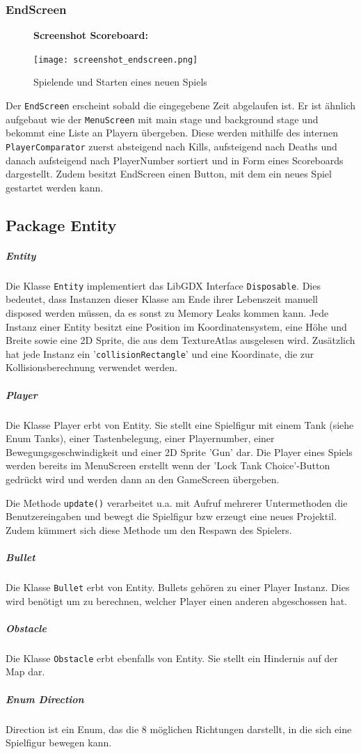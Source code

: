 \documentclass[10pt]{report}
\def\code#1{\texttt{#1}}
\begin{document}
\subsubsection{EndScreen}
\begin{figure}[H]
  \textbf{Screenshot Scoreboard:}\par\medskip
  \centering
\texttt{[image: screenshot\_endscreen.png]}    
\caption{Spielende und Starten eines neuen Spiels}
\end{figure}
Der \code{EndScreen} erscheint sobald die eingegebene Zeit abgelaufen ist. Er ist ähnlich aufgebaut wie der \code{MenuScreen} mit main stage und background stage und bekommt eine Liste an Playern übergeben. Diese werden mithilfe des internen \code{PlayerComparator} zuerst absteigend nach Kills, aufsteigend nach Deaths und danach aufsteigend nach PlayerNumber sortiert und in Form eines Scoreboards dargestellt. Zudem besitzt EndScreen einen Button, mit dem ein neues Spiel gestartet werden kann.

\newpage
\subsection{Package Entity}
\subparagraph{Entity}
Die Klasse \code{Entity} implementiert das LibGDX Interface \code{Disposable}. Dies bedeutet, dass Instanzen dieser Klasse am Ende ihrer Lebenszeit manuell disposed werden müssen, da es sonst zu Memory Leaks kommen kann. 
Jede Instanz einer Entity besitzt eine Position im Koordinatensystem, eine Höhe und Breite sowie eine 2D Sprite, die aus dem TextureAtlas ausgelesen wird.
Zusätzlich hat jede Instanz ein '\code{collisionRectangle}' und eine Koordinate, die zur Kollisionsberechnung verwendet werden.


\subparagraph{Player}
Die Klasse Player erbt von Entity. Sie stellt eine Spielfigur mit einem Tank (siehe Enum Tanks), einer Tastenbelegung, einer Playernumber, einer Bewegungsgeschwindigkeit und einer 2D Sprite 'Gun' dar. Die Player eines Spiels werden bereits im MenuScreen erstellt wenn der 'Lock Tank Choice'-Button gedrückt wird und werden dann an den GameScreen übergeben.

Die Methode \code{update()} verarbeitet u.a. mit Aufruf mehrerer Untermethoden die Benutzereingaben und bewegt die Spielfigur bzw erzeugt eine neues Projektil. Zudem kümmert sich diese Methode um den Respawn des Spielers.
\subparagraph{Bullet}
Die Klasse \code{Bullet} erbt von Entity. Bullets gehören zu einer Player Instanz. Dies wird benötigt um zu berechnen, welcher Player einen anderen abgeschossen hat.
\subparagraph{Obstacle}
Die Klasse \code{Obstacle} erbt ebenfalls von Entity. Sie stellt ein Hindernis auf der Map dar.
\subparagraph{Enum Direction}
Direction ist ein Enum, das die 8 möglichen Richtungen darstellt, in die sich eine Spielfigur bewegen kann.
\end{document}
